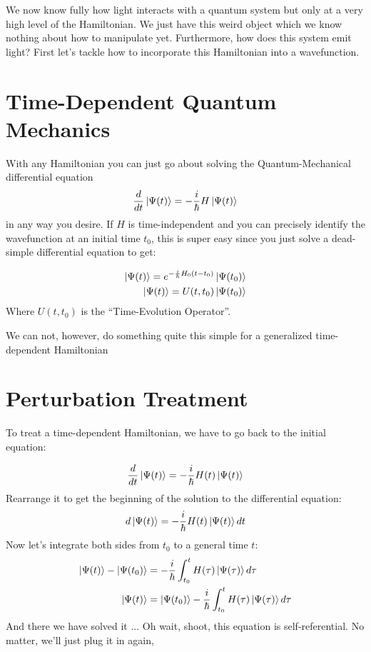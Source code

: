 We now know fully how light interacts with a quantum system but only at a very high level of the Hamiltonian.  We just have this weird object which we know nothing about how to manipulate yet.  Furthermore, how does this system emit light?  First let's tackle how to incorporate this Hamiltonian into a wavefunction.






\section{Time-Dependent Quantum Mechanics}

With any Hamiltonian you can just go about solving the  Quantum-Mechanical differential equation
\begin{align*}
	\frac{d}{dt} \Ket{\Psi(t)}  = - \frac{i}{\hbar} H \Ket{\Psi(t)}
\end{align*}
in any way you desire.  If $H$ is time-independent and you can precisely identify the wavefunction at an initial time $t_0$, this is super easy since you just solve a dead-simple differential equation to get:

\begin{align*}
	\Ket{\Psi (t)}  = e^{- \frac{i}{\hbar} H_0 (t - t_0)} \Ket{\Psi(t_0)}  \\
	\Ket{\Psi (t)}  = U(t, t_0) \Ket{\Psi(t_0)}
\end{align*}
Where $U(t, t_0)$ is the ``Time-Evolution Operator''.

We can not, however, do something quite this simple for a generalized time-dependent Hamiltonian

\section{Perturbation Treatment}
To treat a time-dependent Hamiltonian, we have to go back to the initial equation:

\begin{align*}
	\frac{d}{dt} \Ket{\Psi(t)}  = - \frac{i}{\hbar} H(t) \Ket{\Psi(t)}
\end{align*}
Rearrange it to get the beginning of the solution to the differential equation:
\begin{align*}
	d \Ket{\Psi(t)}  = - \frac{i}{\hbar} H(t)  \Ket{\Psi(t)} dt
\end{align*}
Now let's integrate both sides from $t_0$ to a general time $t$:
\begin{align*}
	\Ket{\Psi(t)} - \Ket{\Psi(t_0)}  &= - \frac{i}{\hbar} \int_{t_0}^{t} H(\tau)  \Ket{\Psi(\tau)} d\tau \\
	\Ket{\Psi(t)} & = \Ket{\Psi(t_0)} - \frac{i}{\hbar} \int_{t_0}^{t} H(\tau)  \Ket{\Psi(\tau)} d\tau
\end{align*}
And there we have solved it ... Oh wait, shoot, this equation is self-referential.  No matter, we'll just plug it in again,

